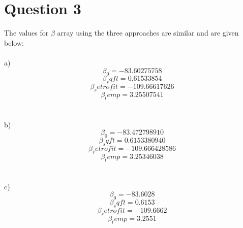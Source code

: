 \documentclass{article}
\begin{document}
\section{Question 3}
The values for $\beta$ array using the three approaches are similar and are given below:\\
\\a)
$$\beta_0 = -83.60275758$$
$$\beta_sqft = 0.61533854$$
$$\beta_retrofit =-109.66617626$$
$$\beta_temp = 3.25507541$$\\
\\b)
$$\beta_0 = -83.472798910$$
$$\beta_sqft = 0.6153380940$$
$$\beta_retrofit =-109.666428586$$
$$\beta_temp = 3.25346038$$\\
\\c)
$$\beta_0 = -83.6028$$
$$\beta_sqft = 0.6153$$
$$\beta_retrofit =-109.6662$$
$$\beta_temp = 3.2551$$
\end{document}
